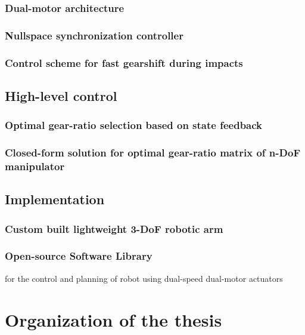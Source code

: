 \subsubsection{Dual-motor architecture}

\subsubsection{Nullspace synchronization controller}

\subsubsection{Control scheme for fast gearshift during impacts}

\subsection{High-level control}

\subsubsection{Optimal gear-ratio selection based on state feedback}

\subsubsection{Closed-form solution for optimal gear-ratio matrix of n-DoF manipulator}

\subsection{Implementation}

\subsubsection{Custom built lightweight 3-DoF robotic arm}

\subsubsection{Open-source Software Library}

for the control and planning of robot using dual-speed dual-motor actuators


\section{Organization of the thesis}
\label{sec:OrganisationOfTheThesis}




